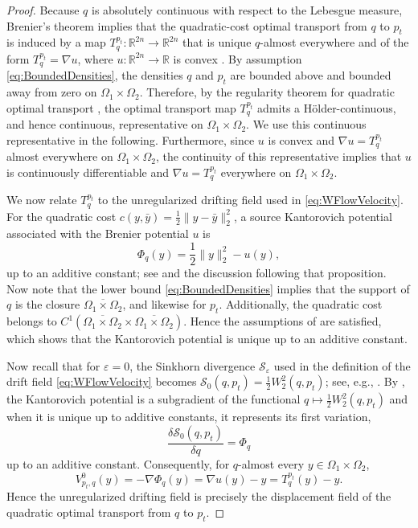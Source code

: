 \documentclass[oneside,11pt]{article}
\theoremstyle{remark}
\newcommand{\R}{\mathbb{R}}
\begin{document}
\begin{proof}
Because $q$ is absolutely continuous with respect to the Lebesgue measure,
Brenier's theorem implies that the quadratic-cost optimal transport from
$q$ to $p_t$ is induced by a map
$T_q^{p_t}:\R^{2n}\to\R^{2n}$ that is unique $q$-almost everywhere and of the form
$T_q^{p_t}=\nabla u$, where $u:\R^{2n}\to\R$ is convex \cite[Theorem~2.26]{Ambrosio2013}. By assumption \eqref{eq:BoundedDensities}, the densities $q$ and $p_t$ are bounded above and bounded away from zero on $\Omega_1 \times \Omega_2$. Therefore, by the regularity theorem for quadratic optimal transport \cite[Theorem~2.27]{Ambrosio2013}, the optimal transport map $T_q^{p_t}$ admits a H\"older-continuous, and hence continuous, representative on $\Omega_1\times\Omega_2$. We use this continuous representative in the following. Furthermore, since $u$ is convex and $\nabla u=T_q^{p_t}$ almost everywhere on $\Omega_1\times\Omega_2$, the continuity of this representative implies that $u$ is continuously differentiable and $\nabla u = T_{q}^{p_t}$ everywhere on $\Omega_1 \times \Omega_2$.




We now relate $T_q^{p_t}$ to the unregularized drifting field used in
\eqref{eq:WFlowVelocity}. For the quadratic cost
$c(y,\bar y)=\frac12\|y-\bar y\|_2^2$, a source Kantorovich potential
associated with the Brenier potential $u$ is
\[
    \Phi_q(y)
    =
    \frac12\|y\|_2^2-u(y),
\]
up to an additive constant; see \cite[Proposition~1.21]{santambrogio2015optimal} and the discussion following that proposition. Now note that 
the lower bound
\eqref{eq:BoundedDensities} implies that the support of $q$ is the closure $\overline{\Omega_1 \times \Omega_2}$, and likewise for $p_t$. Additionally, the quadratic cost belongs
to $C^1(\overline{\Omega_1 \times \Omega_2} \times \overline{\Omega_1 \times \Omega_2})$. Hence the assumptions of
\cite[Proposition~7.18]{santambrogio2015optimal} are satisfied, which shows that the
Kantorovich potential is unique up to an additive constant.



Now recall that for $\varepsilon = 0$, the Sinkhorn divergence $\mathcal{S}_{\varepsilon}$ used in the definition of the drift field \eqref{eq:WFlowVelocity} becomes $\mathcal{S}_0(q, p_t) = \frac{1}{2}W_2^2(q, p_t)$; see, e.g., \cite{han2026wflow}. By \cite[Proposition~7.17]{santambrogio2015optimal}, the Kantorovich potential is a subgradient of the functional $q\mapsto\frac12W_2^2(q,p_t)$ and when it is unique up to additive constants, it represents its first variation, 
\[
\frac{\delta\mathcal S_0(q,p_t)}{\delta q}
=
\Phi_q
\]
up to an additive constant. Consequently, for $q$-almost every
$y\in\Omega_1\times\Omega_2$,
\[
    V_{p_t,q}^0(y)
    =
    -\nabla\Phi_q(y)
    =
    \nabla u(y)-y
    =
    T_q^{p_t}(y)-y.
\]
Hence the unregularized drifting field is precisely the displacement
field of the quadratic optimal transport from $q$ to $p_t$.


\end{proof}
\end{document}
